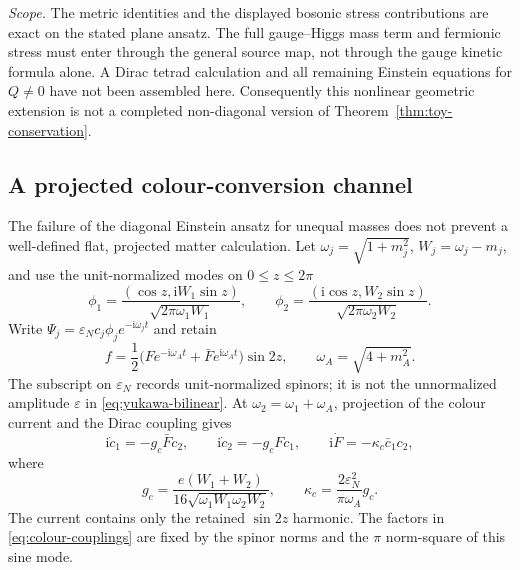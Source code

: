 \documentclass[11pt,a4paper,oneside]{book}
\theoremstyle{plain}
\theoremstyle{definition}
\theoremstyle{remark}
\newcommand{\ii}{\mathrm i}
\newcommand{\src}[2]{\cite{#1}}
\newcommand{\scope}[1]{\par\smallskip\noindent\textit{Scope.} #1\par\smallskip}
\begin{document}
\scope{The metric identities and the displayed bosonic stress contributions
are exact on the stated plane ansatz.  The full gauge--Higgs mass term and
fermionic stress must enter through the general source map, not through
the gauge kinetic formula alone.  A Dirac tetrad calculation and all
remaining Einstein equations for $Q\ne0$ have not been assembled here.
Consequently this nonlinear geometric extension is not a completed
non-diagonal version of Theorem~\ref{thm:toy-conservation}.}

\subsection{A projected colour-conversion channel}
The failure of the diagonal Einstein ansatz for unequal masses does not
prevent a well-defined flat, projected matter calculation.  Let
$\omega_j=\sqrt{1+m_j^2}$, $W_j=\omega_j-m_j$, and use the unit-normalized
modes on $0\le z\le2\pi$
\begin{equation}
 \phi_1=\frac{(\cos z,\ii W_1\sin z)}{\sqrt{2\pi\omega_1W_1}},
 \qquad
 \phi_2=\frac{(\ii\cos z,W_2\sin z)}{\sqrt{2\pi\omega_2W_2}}.
 \label{eq:colour-normalized-modes}
\end{equation}
Write $\Psi_j=\varepsilon_Nc_j\phi_je^{-\ii\omega_jt}$ and retain
\[
 f=\frac12\bigl(F e^{-\ii\omega_At}+\bar F e^{\ii\omega_At}\bigr)
                    \sin2z,\qquad \omega_A=\sqrt{4+m_A^2}.
\]
The subscript on $\varepsilon_N$ records unit-normalized spinors; it is
not the unnormalized amplitude $\varepsilon$ in
\eqref{eq:yukawa-bilinear}.  At $\omega_2=\omega_1+\omega_A$, projection
of the colour current and the Dirac coupling gives
\begin{equation}
 \ii\dot c_1=-g_c\bar F c_2,\qquad
 \ii\dot c_2=-g_cF c_1,\qquad
 \ii\dot F=-\kappa_c\bar c_1c_2,
 \label{eq:colour-three-wave}
\end{equation}
where
\begin{equation}
 g_c=\frac{e(W_1+W_2)}{16\sqrt{\omega_1W_1\omega_2W_2}},
 \qquad
 \kappa_c=\frac{2\varepsilon_N^2}{\pi\omega_A}g_c.
 \label{eq:colour-couplings}
\end{equation}
The current contains only the retained $\sin2z$ harmonic.  The factors
in \eqref{eq:colour-couplings} are fixed by the spinor norms and the
$\pi$ norm-square of this sine mode.  \src{R20}{thm:v20v28-threewave}
\end{document}
